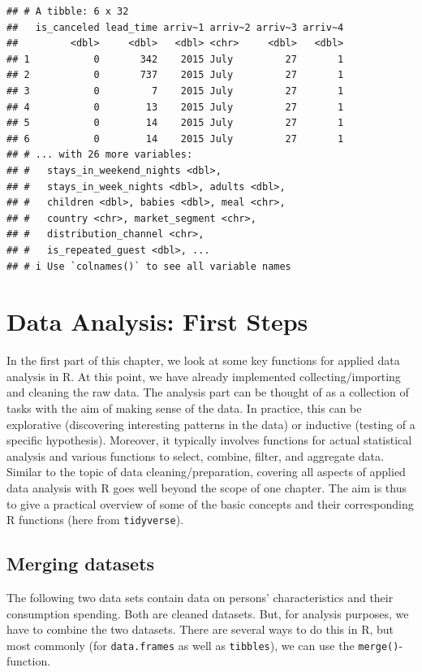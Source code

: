 \documentclass[
  12pt,
]{style/krantz}
\begin{document}
\begin{verbatim}
## # A tibble: 6 x 32
##   is_canceled lead_time arriv~1 arriv~2 arriv~3 arriv~4
##         <dbl>     <dbl>   <dbl> <chr>     <dbl>   <dbl>
## 1           0       342    2015 July         27       1
## 2           0       737    2015 July         27       1
## 3           0         7    2015 July         27       1
## 4           0        13    2015 July         27       1
## 5           0        14    2015 July         27       1
## 6           0        14    2015 July         27       1
## # ... with 26 more variables:
## #   stays_in_weekend_nights <dbl>,
## #   stays_in_week_nights <dbl>, adults <dbl>,
## #   children <dbl>, babies <dbl>, meal <chr>,
## #   country <chr>, market_segment <chr>,
## #   distribution_channel <chr>,
## #   is_repeated_guest <dbl>, ...
## # i Use `colnames()` to see all variable names
\end{verbatim}

\hypertarget{data-analysis-first-steps}{%
\chapter{Data Analysis: First Steps}\label{data-analysis-first-steps}}

In the first part of this chapter, we look at some key functions for applied data analysis in R. At this point, we have already implemented collecting/importing and cleaning the raw data. The analysis part can be thought of as a collection of tasks with the aim of making sense of the data. In practice, this can be explorative (discovering interesting patterns in the data) or inductive (testing of a specific hypothesis). Moreover, it typically involves functions for actual statistical analysis and various functions to select, combine, filter, and aggregate data. Similar to the topic of data cleaning/preparation, covering all aspects of applied data analysis with R goes well beyond the scope of one chapter. The aim is thus to give a practical overview of some of the basic concepts and their corresponding R functions (here from \texttt{tidyverse}).

\hypertarget{merging-datasets}{%
\section{Merging datasets}\label{merging-datasets}}

The following two data sets contain data on persons' characteristics and their consumption spending. Both are cleaned datasets. But, for analysis purposes, we have to combine the two datasets. There are several ways to do this in R, but most commonly (for \texttt{data.frames} as well as \texttt{tibbles}), we can use the \texttt{merge()}-function.
\end{document}
